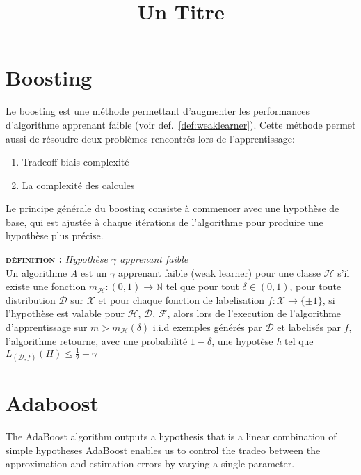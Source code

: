 \documentclass[12pt, a4paper]{article}
\title{Un Titre}
\newcounter{NoDef}
\newenvironment{definition}[1]{
    \refstepcounter{NoDef}
    
    
    \vspace{0.3cm}
    \textbf{\textsc{définition \theNoDef:}} \textit{#1}\\
}{

\vspace{0.3cm}
}
\begin{document}
\maketitle

\section{Boosting}

    Le boosting est une méthode permettant d'augmenter les performances\\ d'algorithme apprenant
    faible (voir def.~\ref{def:weaklearner}). Cette méthode permet aussi de résoudre deux problèmes
    rencontrés lors de l'apprentissage:
    \begin{enumerate}
        \item Tradeoff biais-complexité
        \item La complexité des calcules
    \end{enumerate}
    Le principe générale du boosting consiste à commencer avec une hypothèse de base,
    qui est ajustée à chaque itérations de l'algorithme pour produire une hypothèse plus précise.


    \begin{definition}{Hypothèse $\gamma$ apprenant faible}
    Un algorithme \textit{A} est un $\gamma$ apprenant faible (weak learner) pour une classe
    $\mathcal{H}$ s'il existe une fonction $m_{\mathcal{H}}: (0,1) \rightarrow \mathbb{N}$ tel que 
    pour tout $\delta \in (0,1)$, pour toute distribution $\mathcal{D}$ sur $\mathcal{X}$ et pour
    chaque fonction de labelisation $f:\mathcal{X} \rightarrow \{\pm 1\}$, si l'hypothèse est
    valable pour $\mathcal{H}$, $\mathcal{D}$, $\mathcal{F}$, alors lors de l'execution de l'algorithme
    d'apprentissage sur $m > m_{\mathcal{H}}(\delta)$ i.i.d exemples générés par $\mathcal{D}$ et
    labelisés par $f$, l'algorithme retourne, avec une probabilité $1- \delta$, une hypotèse
    \textit{h} tel que $L_{(\mathcal{D}, f)}(H) \leq \frac{1}{2} - \gamma$
    \label{def:weaklearner}
    \end{definition}



\section{Adaboost}
 The AdaBoost algorithm
outputs a hypothesis that is a linear combination of simple hypotheses
AdaBoost enables us to control the tradeo between the approximation and estimation errors by
varying a single parameter.
\end{document}
